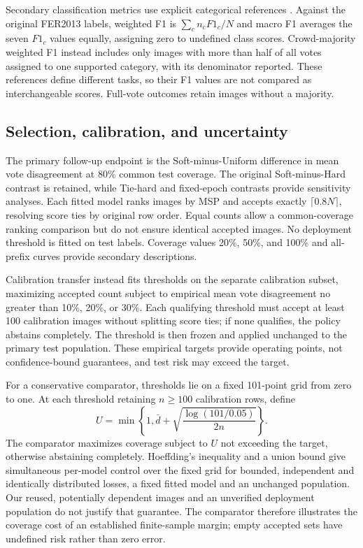 \documentclass[pdflatex,sn-mathphys-num]{sn-jnl}
\begin{document}
Secondary classification metrics use explicit categorical references \cite{sokolova2009metrics}. Against the original FER2013 labels, weighted F1 is $\sum_c n_c F1_c/N$ and macro F1 averages the seven $F1_c$ values equally, assigning zero to undefined class scores. Crowd-majority weighted F1 instead includes only images with more than half of all votes assigned to one supported category, with its denominator reported. These references define different tasks, so their F1 values are not compared as interchangeable scores. Full-vote outcomes retain images without a majority.

\subsection{Selection, calibration, and uncertainty}
The primary follow-up endpoint is the Soft-minus-Uniform difference in mean vote disagreement at 80\% common test coverage. The original Soft-minus-Hard contrast is retained, while Tie-hard and fixed-epoch contrasts provide sensitivity analyses. Each fitted model ranks images by MSP and accepts exactly $\lceil0.8N\rceil$, resolving score ties by original row order. Equal counts allow a common-coverage ranking comparison but do not ensure identical accepted images. No deployment threshold is fitted on test labels. Coverage values 20\%, 50\%, and 100\% and all-prefix curves provide secondary descriptions.

Calibration transfer instead fits thresholds on the separate calibration subset, maximizing accepted count subject to empirical mean vote disagreement no greater than 10\%, 20\%, or 30\%. Each qualifying threshold must accept at least 100 calibration images without splitting score ties; if none qualifies, the policy abstains completely. The threshold is then frozen and applied unchanged to the primary test population. These empirical targets provide operating points, not confidence-bound guarantees, and test risk may exceed the target.

For a conservative comparator, thresholds lie on a fixed 101-point grid from zero to one. At each threshold retaining $n\geq100$ calibration rows, define
\begin{equation}
U=\min\!\left\{1,\bar d+\sqrt{\frac{\log(101/0.05)}{2n}}\right\}.
\end{equation}
The comparator maximizes coverage subject to $U$ not exceeding the target, otherwise abstaining completely. Hoeffding's inequality \cite{hoeffding1963} and a union bound give simultaneous per-model control over the fixed grid for bounded, independent and identically distributed losses, a fixed fitted model and an unchanged population. Our reused, potentially dependent images and an unverified deployment population do not justify that guarantee. The comparator therefore illustrates the coverage cost of an established finite-sample margin; empty accepted sets have undefined risk rather than zero error.
\end{document}
